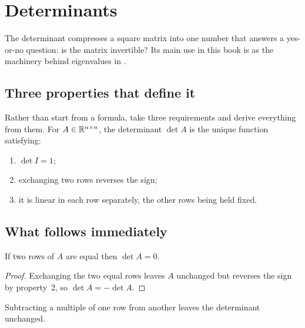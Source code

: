 \setchapterpreamble[u]{\margintoc}
\chapter{Determinants}


The determinant compresses a square matrix into one number that answers a
yes-or-no question: is the matrix invertible? Its main use in this book is as
the machinery behind eigenvalues in .

\section{Three properties that define it}

Rather than start from a formula, take three requirements and derive everything
from them. For \(A\in\mathbb{R}^{n\times n}\), the determinant \(\det A\) is the unique
function satisfying:

\begin{enumerate}
	\item \(\det I=1\);
	\item exchanging two rows reverses the sign;
	\item it is linear in each row separately, the other rows being held fixed.
\end{enumerate}


\section{What follows immediately}

\begin{proposition}
If two rows of \(A\) are equal then \(\det A=0\).
\end{proposition}

\begin{proof}
Exchanging the two equal rows leaves \(A\) unchanged but reverses the sign by
property~2, so \(\det A=-\det A\).
\end{proof}

\begin{proposition}
Subtracting a multiple of one row from another leaves the determinant unchanged.
\end{proposition}


